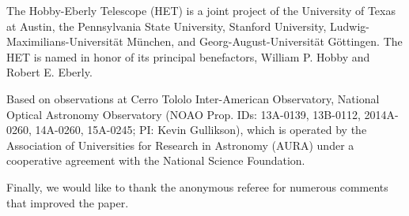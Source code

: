 \documentclass{emulateapj}
\begin{document}
The Hobby-Eberly Telescope (HET) is a joint project of the University of Texas at Austin, the Pennsylvania State University, Stanford University, Ludwig-Maximilians-Universit\"at M\"unchen, and Georg-August-Universit\"at G\"ottingen. The HET is named in honor of its principal benefactors, William P. Hobby and Robert E. Eberly.

Based on observations at Cerro Tololo Inter-American Observatory, National Optical Astronomy Observatory (NOAO Prop. IDs: 13A-0139, 13B-0112, 2014A-0260, 14A-0260, 15A-0245; PI: Kevin Gullikson), which is operated by the Association of Universities for Research in Astronomy (AURA) under a cooperative agreement with the National Science Foundation. 

Finally, we would like to thank the anonymous referee for numerous comments that improved the paper.









\newpage
\clearpage
\end{document}
